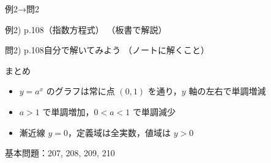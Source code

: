 \documentclass[aspectratio=43,professionalfonts,handout]{beamer}
\begin{document}
\begin{frame}{例2→問2}
  \begin{exampleblock}{例2) p.108（指数方程式）}
    （板書で解説）
  \end{exampleblock}

  \vfill

  \begin{block}{問2) p.108\quad 自分で解いてみよう}
    （ノートに解くこと）
  \end{block}
\end{frame}

\begin{frame}{まとめ}
  \begin{itemize}
    \item $y = a^x$ のグラフは常に点 $(0, 1)$ を通り，$y$ 軸の左右で単調増減
    \item $a > 1$ で単調増加，$0 < a < 1$ で単調減少
    \item 漸近線 $y = 0$，定義域は全実数，値域は $y > 0$
  \end{itemize}

  \vfill
  {\small 基本問題：207, 208, 209, 210}
\end{frame}
\end{document}
